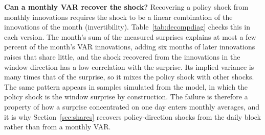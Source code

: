 \documentclass[11pt]{article}
\begin{document}
\begin{appendices}
\textbf{Can a monthly VAR recover the shock?} Recovering a policy shock from monthly innovations requires the shock to be a linear combination of the innovations of the month (invertibility). Table~\ref{tab:decompdiag} checks this in each version. The month's sum of the measured surprises explains at most a few percent of the month's VAR innovations, adding six months of later innovations raises that share little, and the shock recovered from the innovations in the window direction has a low correlation with the surprise. Its implied variance is many times that of the surprise, so it mixes the policy shock with other shocks. The same pattern appears in samples simulated from the model, in which the policy shock is the window surprise by construction. The failure is therefore a property of how a surprise concentrated on one day enters monthly averages, and it is why Section~\ref{sec:shares} recovers policy-direction shocks from the daily block rather than from a monthly VAR.





\FloatBarrier

\end{appendices}
\end{document}

